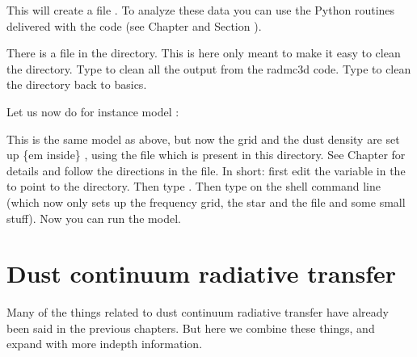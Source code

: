\documentclass[letterpaper,10pt,english]{sphinxmanual}
\begin{document}
This will create a file .  To analyze these data you can use the
Python routines delivered with the code (see Chapter
{\hyperref[\detokenize{pythontools:chap-python-analysis-tools}]{}} and Section {\hyperref[\detokenize{installation:sec-install-pythonscripts}]{}}).

There is a file  in the directory. This is here only meant to make
it easy to clean the directory. Type  to clean all the output
from the radmc3d code. Type  to clean the directory back to
basics.

Let us now do for instance model :

\begin{sphinxVerbatim}[commandchars=\\\{\}]
 
\end{sphinxVerbatim}

This is the same model as above, but now the grid and the dust density are set
up \{em inside\} , using the file  which is
present in this directory.  See Chapter {\hyperref[\detokenize{internalsetup:chap-internal-setup}]{}} for details
and follow the directions in the  file. In short: first edit the
variable  in the  to point to the  directory. Then
type . Then type  on the shell command line
(which now only sets up the frequency grid, the star and the 
file and some small stuff). Now you can run the model.



\chapter{Dust continuum radiative transfer}
\label{\detokenize{dustradtrans:dust-continuum-radiative-transfer}}\label{\detokenize{dustradtrans:chap-dust-transfer}}\label{\detokenize{dustradtrans::doc}}
Many of the things related to dust continuum radiative transfer have
already been said in the previous chapters. But here we combine these
things, and expand with more in\sphinxhyphen{}depth information.
\end{document}
